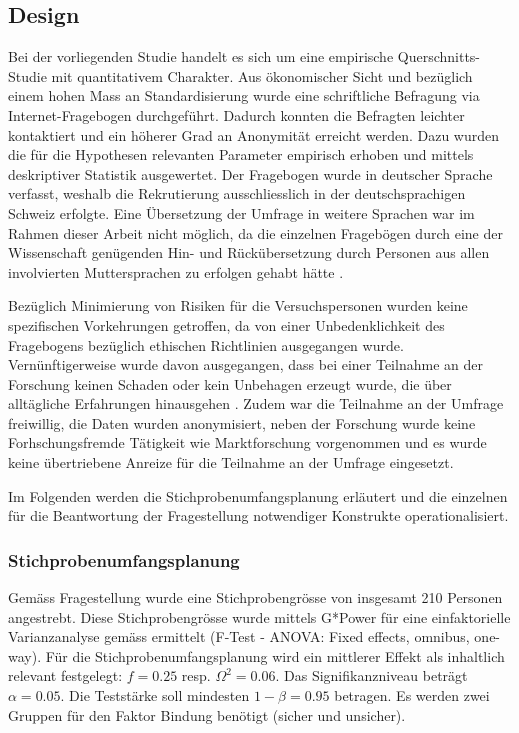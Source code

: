 \subsection{Design} \label{sec:Design}
Bei der vorliegenden Studie handelt es sich um eine empirische Querschnitts-Studie mit quantitativem Charakter. Aus ökonomischer Sicht und bezüglich einem hohen Mass an Standardisierung \cite[S.~86ff]{sedlmeier2008} wurde eine schriftliche Befragung via Internet-Fragebogen durchgeführt. Dadurch konnten die Befragten leichter kontaktiert und ein höherer Grad an Anonymität erreicht werden. Dazu wurden die für die Hypothesen relevanten Parameter empirisch erhoben und mittels deskriptiver Statistik ausgewertet. Der Fragebogen wurde in deutscher Sprache verfasst, weshalb die Rekrutierung ausschliesslich in der deutschsprachigen Schweiz erfolgte. Eine Übersetzung der Umfrage in weitere Sprachen war im Rahmen dieser Arbeit nicht möglich, da die einzelnen Fragebögen durch eine der Wissenschaft genügenden Hin- und Rückübersetzung durch Personen aus allen involvierten Muttersprachen zu erfolgen gehabt hätte \cite{Pfetsch2016}.

Bezüglich Minimierung von Risiken für die Versuchspersonen wurden keine spezifischen Vorkehrungen getroffen, da von einer Unbedenklichkeit des Fragebogens bezüglich ethischen Richtlinien ausgegangen wurde. Vernünftigerweise wurde davon ausgegangen, dass bei einer Teilnahme an der Forschung keinen Schaden oder kein Unbehagen erzeugt wurde, die über
alltägliche Erfahrungen hinausgehen \cite{DGP1998}. Zudem war die Teilnahme an der Umfrage freiwillig, die Daten wurden anonymisiert, neben der Forschung wurde keine Forhschungsfremde Tätigkeit wie Marktforschung vorgenommen und es wurde keine übertriebene Anreize für die Teilnahme an der Umfrage eingesetzt.

Im Folgenden werden die Stichprobenumfangsplanung erläutert und die einzelnen für die Beantwortung der Fragestellung notwendiger Konstrukte operationalisiert.

\subsubsection{Stichprobenumfangsplanung}\label{sec:Stichprobenumfangsplanung}
Gemäss Fragestellung wurde eine Stichprobengrösse von insgesamt 210 Personen angestrebt. Diese Stichprobengrösse wurde mittels G*Power \cite{Faul2009} für eine einfaktorielle Varianzanalyse gemäss  ermittelt (F-Test - ANOVA: Fixed effects, omnibus, one-way).
Für die Stichprobenumfangsplanung wird ein mittlerer Effekt \cite{Cohen1988a} als inhaltlich relevant festgelegt: $f = 0.25$ resp. $\Omega^2 = 0.06$. Das Signifikanzniveau beträgt $\alpha=0.05$. Die Teststärke soll mindesten $1-\beta=0.95$ betragen. Es werden zwei Gruppen für den Faktor Bindung benötigt (sicher und unsicher).


